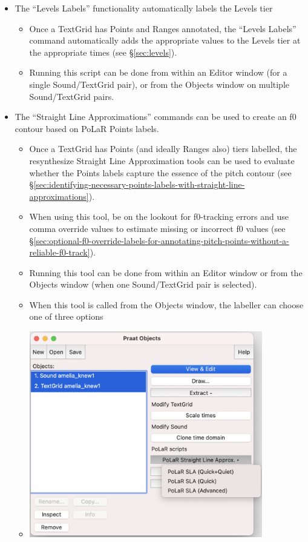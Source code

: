 \documentclass[11pt, twoside]{memoir}
\begin{document}
\begin{itemize}
	\item The “Levels Labels” functionality automatically labels the Levels tier
	\begin{itemize}
		\item Once a TextGrid has Points and Ranges annotated, the “Levels Labels” command automatically adds the appropriate values to the Levels tier at the appropriate times (see §\ref{sec:levels}).
		\item Running this script can be done from within an Editor window (for a single Sound\slash TextGrid pair), or from the Objects window on multiple Sound\slash TextGrid pairs.
	\end{itemize}
	\item The “Straight Line Approximations” commands can be used to create an f0 contour based on PoLaR Points labels.
	\begin{itemize}
		\item Once a TextGrid has Points (and ideally Ranges also) tiers labelled, the resynthesize Straight Line Approximation tools can be used to evaluate whether the Points labels capture the essence of the pitch contour (see §\ref{sec:identifying-necessary-points-labels-with-straight-line-approximations}).
		\item When using this tool, be on the lookout for f0-tracking errors and use comma override values to estimate missing or incorrect f0 values (see §\ref{sec:optional-f0-override-labels-for-annotating-pitch-points-without-a-reliable-f0-track}). 
		\item Running this tool can be done from within an Editor window or from the Objects window (when one Sound\slash TextGrid pair is selected).
		\item When this tool is called from the Objects window, the labeller can choose one of three options
		\item[] \includegraphics[width=4in]{Practical-Plugin-4-Objects-Window-SLA.png}

\end{itemize}
\end{itemize}
\end{document}
